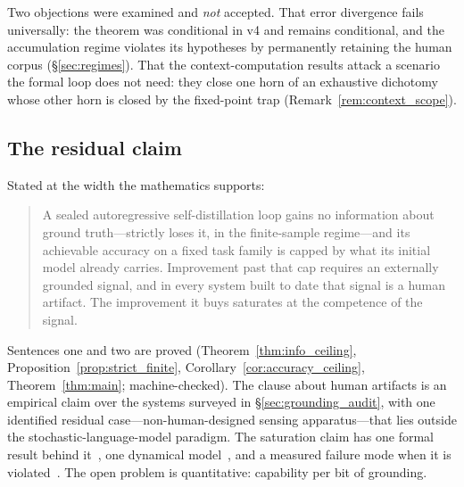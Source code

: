 \documentclass[11pt,a4paper]{article}
\begin{document}
\noindent Two objections were examined and \emph{not} accepted. That error divergence fails universally: the theorem was conditional in v4 and remains conditional, and the accumulation regime violates its hypotheses by permanently retaining the human corpus (\S\ref{sec:regimes}). That the context-computation results attack a scenario the formal loop does not need: they close one horn of an exhaustive dichotomy whose other horn is closed by the fixed-point trap (Remark~\ref{rem:context_scope}).

\subsection{The residual claim}

Stated at the width the mathematics supports:

\begin{quote}
A sealed autoregressive self-distillation loop gains no information about ground truth---strictly loses it, in the finite-sample regime---and its achievable accuracy on a fixed task family is capped by what its initial model already carries. Improvement past that cap requires an externally grounded signal, and in every system built to date that signal is a human artifact. The improvement it buys saturates at the competence of the signal.
\end{quote}

Sentences one and two are proved (Theorem~\ref{thm:info_ceiling}, Proposition~\ref{prop:strict_finite}, Corollary~\ref{cor:accuracy_ceiling}, Theorem~\ref{thm:main}; machine-checked). The clause about human artifacts is an empirical claim over the systems surveyed in \S\ref{sec:grounding_audit}, with one identified residual case---non-human-designed sensing apparatus---that lies outside the stochastic-language-model paradigm. The saturation claim has one formal result behind it~\cite{yi2026escaping}, one dynamical model~\cite{sun2025solververifier}, and a measured failure mode when it is violated~\cite{lin2026verifiers}. The open problem is quantitative: capability per bit of grounding.

\end{document}
